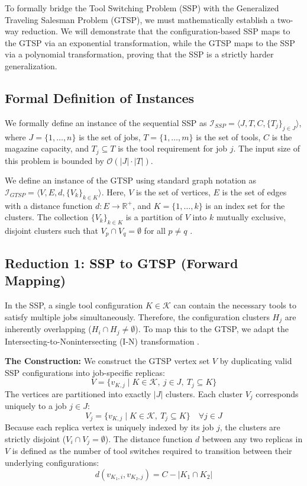 \documentclass[12pt]{article}
\begin{document}
To formally bridge the Tool Switching Problem (SSP) with the Generalized Traveling Salesman Problem (GTSP), we must mathematically establish a two-way reduction. We will demonstrate that the configuration-based SSP maps to the GTSP via an exponential transformation, while the GTSP maps to the SSP via a polynomial transformation, proving that the SSP is a strictly harder generalization.

\subsection{Formal Definition of Instances}
We formally define an instance of the sequential SSP as $\mathcal{I}_{SSP} = \langle J, T, C, \{T_j\}_{j \in J} \rangle$, where $J = \{1, \dots, n\}$ is the set of jobs, $T = \{1, \dots, m\}$ is the set of tools, $C$ is the magazine capacity, and $T_j \subseteq T$ is the tool requirement for job $j$. The input size of this problem is bounded by $\mathcal{O}(|J| \cdot |T|)$. 

We define an instance of the GTSP using standard graph notation as $\mathcal{I}_{GTSP} = \langle V, E, d, \{V_k\}_{k \in K} \rangle$. Here, $V$ is the set of vertices, $E$ is the set of edges with a distance function $d : E \to \mathbb{R}^+$, and $K = \{1, \dots, k\}$ is an index set for the clusters. The collection $\{V_k\}_{k \in K}$ is a partition of $V$ into $k$ mutually exclusive, disjoint clusters such that $V_p \cap V_q = \emptyset$ for all $p \neq q$ \parencite{Pop2024}.

\subsection{Reduction 1: SSP to GTSP (Forward Mapping)}

In the SSP, a single tool configuration $K \in \mathcal{K}$ can contain the necessary tools to satisfy multiple jobs simultaneously. Therefore, the configuration clusters $H_j$ are inherently overlapping ($H_i \cap H_j \neq \emptyset$). To map this to the GTSP, we adapt the Intersecting-to-Nonintersecting (I-N) transformation \parencite{Lien1993, Noon1993}.

\textbf{The Construction:} We construct the GTSP vertex set $V$ by duplicating valid SSP configurations into job-specific replicas:
\begin{equation}
	V = \{ v_{K, j} \mid K \in \mathcal{K}, \ j \in J, \ T_j \subseteq K \}
\end{equation}
The vertices are partitioned into exactly $|J|$ clusters. Each cluster $V_j$ corresponds uniquely to a job $j \in J$:
\begin{equation}
	V_j = \{ v_{K, j} \mid K \in \mathcal{K}, \ T_j \subseteq K \} \quad \forall j \in J
\end{equation}
Because each replica vertex is uniquely indexed by its job $j$, the clusters are strictly disjoint ($V_i \cap V_j = \emptyset$). The distance function $d$ between any two replicas in $V$ is defined as the number of tool switches required to transition between their underlying configurations:
\begin{equation}
	d(v_{K_1, i}, v_{K_2, j}) = C - |K_1 \cap K_2|
\end{equation}
\end{document}
